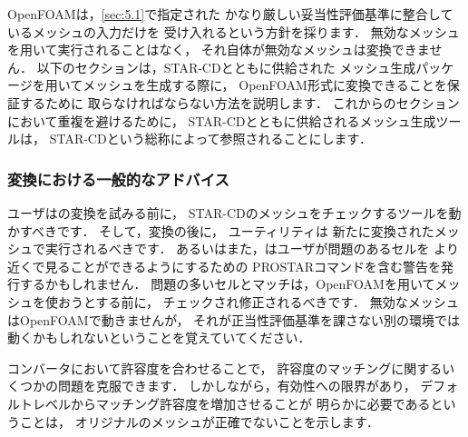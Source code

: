 OpenFOAMは，\autoref{sec:5.1}で指定された
かなり厳しい妥当性評価基準に整合しているメッシュの入力だけを
受け入れるという方針を採ります．
無効なメッシュを用いて実行されることはなく，
それ自体が無効なメッシュは変換できません．
以下のセクションは，STAR-CDとともに供給された
メッシュ生成パッケージを用いてメッシュを生成する際に，
OpenFOAM形式に変換できることを保証するために
取らなければならない方法を説明します．
これからのセクションにおいて重複を避けるために，
STAR-CDとともに供給されるメッシュ生成ツールは，
STAR-CDという総称によって参照されることにします．

\subsubsection{変換における一般的なアドバイス}
\label{sssec:5.5.2.1}
ユーザはの変換を試みる前に，
STAR-CDのメッシュをチェックするツールを動かすべきです．
そして，変換の後に，
%
%
ユーティリティは
新たに変換されたメッシュで実行されるべきです．
あるいはまた，はユーザが問題のあるセルを
より近くで見ることができるようにするための
\textsf{PROSTAR}コマンドを含む警告を発行するかもしれません．
問題の多いセルとマッチは，OpenFOAMを用いてメッシュを使おうとする前に，
チェックされ修正されるべきです．
無効なメッシュはOpenFOAMで動きませんが，
それが正当性評価基準を課さない別の環境では
動くかもしれないということを覚えていてください．

コンバータにおいて許容度を合わせることで，
許容度のマッチングに関するいくつかの問題を克服できます．
しかしながら，有効性への限界があり，
デフォルトレベルからマッチング許容度を増加させることが
明らかに必要であるということは，
オリジナルのメッシュが正確でないことを示します．

